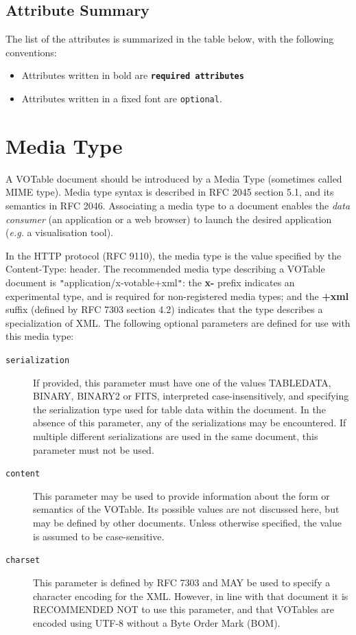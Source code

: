 \documentclass[11pt,a4paper]{ivoa}
\let\fg=\color
\def\attr#1{{\tt{\fg{DarkRed}#1}}}
\def\requiredattr#1{{\tt\bf{\fg{DarkBlue}#1}}}
\def\literalvalue#1{{\tt"}{{\fg{DarkPurple}#1}}{\tt"}}
\begin{document}
\clearpage
\subsection{Attribute Summary}
The list of the attributes is summarized in the table below,
with the following conventions:
\begin{itemize}
\setlength\itemsep{0ex}
\item   Attributes written in bold are \requiredattr{required attributes}
\item   Attributes written in a {fixed font} are \attr{optional}.
\end{itemize}

\begin{quote}\small

\end{quote}

\clearpage
\section{Media Type}
\label{sec:mime}

A VOTable document should be introduced by a Media Type
(sometimes called MIME type).
Media type syntax is described in RFC 2045 section 5.1, and
its semantics in RFC 2046.
Associating a media type to a document enables the {\em data consumer}
(an application or a web browser) to launch the desired application
({\em e.g.} a visualisation tool).

In the HTTP protocol (RFC 9110), the media type is the value specified by the
{\textsf{Content-Type:}} header. The recommended media type describing
a VOTable document is {\literalvalue{\textsf{application/x-votable+xml}}}:
the {\bf x-} prefix indicates an experimental type, and
is required for non-registered media types; and the
{\bf+xml} suffix (defined by RFC 7303 section 4.2)
indicates that the type describes a specialization of XML.
The following optional parameters are defined for use with
this media type:
\begin{description}
\item[{\tt serialization}]
If provided, this parameter must have one of the values
TABLEDATA, BINARY, BINARY2 or FITS,
interpreted case-insensitively,
and specifying the serialization type used for table data within the document.
In the absence of this parameter, any of the serializations may be
encountered.  If multiple different serializations are used in the same
document, this parameter must not be used.

\item[{\tt content}]
This parameter may be used to provide information about the
form or semantics of the VOTable.
Its possible values are not discussed here,
but may be defined by other documents.
Unless otherwise specified, the value is assumed to be case-sensitive.

\item[{\tt charset}]
This parameter is defined by RFC 7303 and MAY be used
to specify a character encoding for the XML.
However, in line with that document it is RECOMMENDED NOT to use
this parameter, and that VOTables are encoded using UTF-8 without a
Byte Order Mark (BOM).
\end{description}
\end{document}
